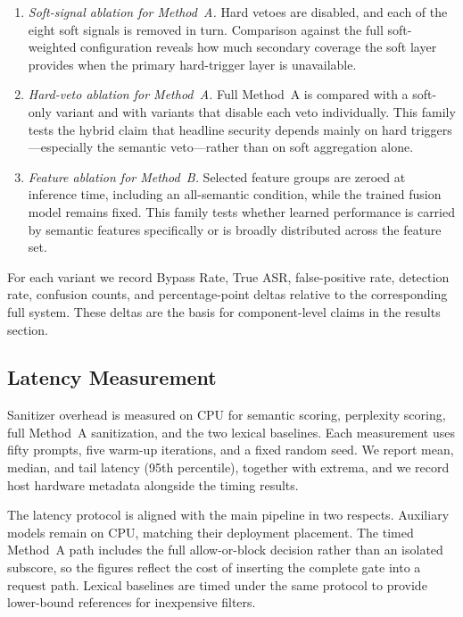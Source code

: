 \begin{enumerate}
  \item \emph{Soft-signal ablation for Method~A.}
    Hard vetoes are disabled, and each of the eight soft signals is removed in turn.
    Comparison against the full soft-weighted configuration reveals how much secondary coverage the soft layer provides when the primary hard-trigger layer is unavailable.
  \item \emph{Hard-veto ablation for Method~A.}
    Full Method~A is compared with a soft-only variant and with variants that disable each veto individually.
    This family tests the hybrid claim that headline security depends mainly on hard triggers---especially the semantic veto---rather than on soft aggregation alone.
  \item \emph{Feature ablation for Method~B.}
    Selected feature groups are zeroed at inference time, including an all-semantic condition, while the trained fusion model remains fixed.
    This family tests whether learned performance is carried by semantic features specifically or is broadly distributed across the feature set.
\end{enumerate}

For each variant we record Bypass Rate, True ASR, false-positive rate, detection rate, confusion counts, and percentage-point deltas relative to the corresponding full system.
These deltas are the basis for component-level claims in the results section.

\subsection{Latency Measurement}
\label{sec:latency-setup}

Sanitizer overhead is measured on CPU for semantic scoring, perplexity scoring, full Method~A sanitization, and the two lexical baselines.
Each measurement uses fifty prompts, five warm-up iterations, and a fixed random seed.
We report mean, median, and tail latency (95th percentile), together with extrema, and we record host hardware metadata alongside the timing results.

The latency protocol is aligned with the main pipeline in two respects.
Auxiliary models remain on CPU, matching their deployment placement.
The timed Method~A path includes the full allow-or-block decision rather than an isolated subscore, so the figures reflect the cost of inserting the complete gate into a request path.
Lexical baselines are timed under the same protocol to provide lower-bound references for inexpensive filters.

